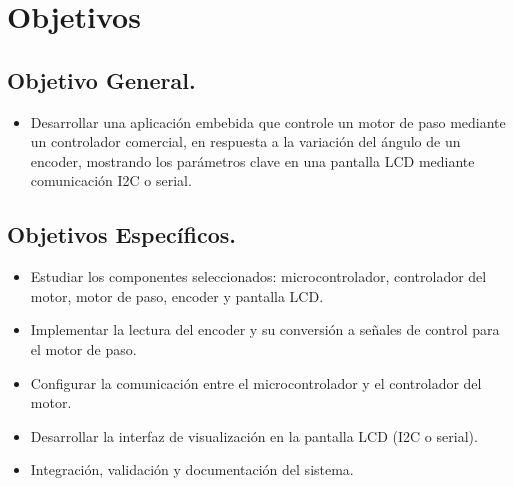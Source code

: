 \chapter{Objetivos}\label{chap:objetivos}

\section{Objetivo General.}

\begin{itemize}
    \item Desarrollar una aplicación embebida que controle un motor de paso mediante un controlador comercial, en respuesta a la variación del ángulo de un encoder, mostrando los parámetros clave en una pantalla LCD mediante comunicación I2C o serial.
\end{itemize}

\section{Objetivos Específicos.}

\begin{itemize}
    \item Estudiar los componentes seleccionados: microcontrolador, controlador del motor, motor de paso, encoder y pantalla LCD.
    \item  Implementar la lectura del encoder y su conversión a señales de control para el motor de paso.
    \item Configurar la comunicación entre el microcontrolador y el controlador del motor.
    \item Desarrollar la interfaz de visualización en la pantalla LCD (I2C o serial).
    \item Integración, validación y documentación del sistema.
\end{itemize}